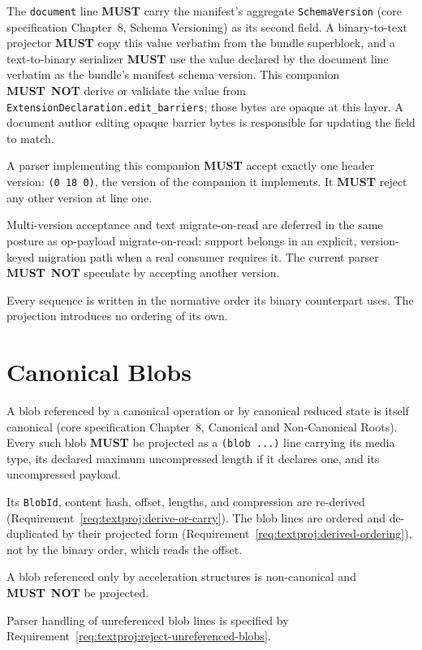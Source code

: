 \documentclass[11pt,letterpaper]{report}
\newcommand{\sectionsc}[1]{{\addfontfeatures{Letters=SmallCaps}#1}}
\newcounter{requirement}[chapter]
\newcommand{\MUST}{\textbf{MUST}}
\newcommand{\MUSTNOT}{\textbf{MUST}\nobreak\ \textbf{NOT}}
\begin{document}
\begin{requirement}
  \label{req:textproj:manifest-schema-carried}
  The \texttt{document} line \MUST{} carry the manifest's aggregate
  \texttt{SchemaVersion} (core specification Chapter~8,
  \sectionsc{Schema Versioning}) as its second field. A binary-to-text
  projector \MUST{} copy this value verbatim from the bundle superblock, and
  a text-to-binary serializer \MUST{} use the value declared by the document
  line verbatim as the bundle's manifest schema version. This companion
  \MUSTNOT{} derive or validate the value from
  \texttt{ExtensionDeclaration.edit\_barriers}; those bytes are opaque at
  this layer. A document author editing opaque barrier bytes is responsible
  for updating the field to match.
\end{requirement}

\begin{requirement}
  \label{req:textproj:header-version}
  A parser implementing this companion \MUST{} accept exactly one header
  version: \texttt{(0 18 0)}, the version of the companion it implements. It
  \MUST{} reject any other version at line one.

  Multi-version acceptance and text migrate-on-read are deferred in the same
  posture as op-payload migrate-on-read: support belongs in an explicit,
  version-keyed migration path when a real consumer requires it. The current
  parser \MUSTNOT{} speculate by accepting another version.
\end{requirement}

Every sequence is written in the normative order its binary counterpart uses. The
projection introduces no ordering of its own.

\section{Canonical Blobs}
\label{sec:content:blobs}

\begin{requirement}
  \label{req:textproj:canonical-blobs}
  A blob referenced by a canonical operation or by canonical reduced state is
  itself canonical (core specification Chapter~8,
  \sectionsc{Canonical and Non-Canonical Roots}). Every such blob \MUST{} be
  projected as a \texttt{(blob ...)} line carrying its media type, its declared
  maximum uncompressed length if it declares one, and its uncompressed payload.

  Its \texttt{BlobId}, content hash, offset, lengths, and compression are
  re-derived (Requirement~\ref{req:textproj:derive-or-carry}). The blob lines are
  ordered and de-duplicated by their projected form
  (Requirement~\ref{req:textproj:derived-ordering}), not by the binary order,
  which reads the offset.

  A blob referenced only by acceleration structures is non-canonical and
  \MUSTNOT{} be projected.

  Parser handling of unreferenced blob lines is specified by
  Requirement~\ref{req:textproj:reject-unreferenced-blobs}.
\end{requirement}
\end{document}
